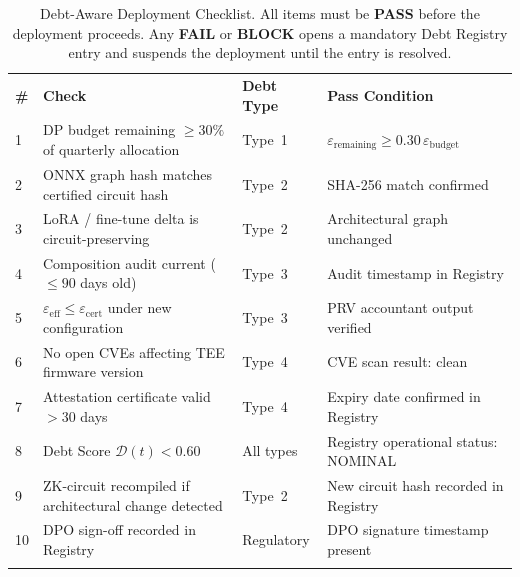 \begin{table}[ht]
\centering
\caption{Debt-Aware Deployment Checklist.
  All items must be \textbf{PASS} before the deployment
  proceeds.
  Any \textbf{FAIL} or \textbf{BLOCK} opens a mandatory
  Debt Registry entry and suspends the deployment until
  the entry is resolved.}
\label{tab:deployment-checklist}
\small
\begin{tabular}{p{0.4cm}p{4.4cm}p{2.0cm}p{4.0cm}}
\hline\noalign{\smallskip}
\textbf{\#}
  & \textbf{Check}
  & \textbf{Debt Type}
  & \textbf{Pass Condition} \\
\noalign{\smallskip}\svhline\noalign{\smallskip}

1 & DP budget remaining $\geq 30\%$ of quarterly allocation
  & Type~1
  & $\varepsilon_{\mathrm{remaining}} \geq 0.30\,
    \varepsilon_{\mathrm{budget}}$ \\[3pt]

2 & ONNX graph hash matches certified circuit hash
  & Type~2
  & SHA-256 match confirmed \\[3pt]

3 & LoRA / fine-tune delta is circuit-preserving
  & Type~2
  & Architectural graph unchanged \\[3pt]

4 & Composition audit current ($\leq 90$ days old)
  & Type~3
  & Audit timestamp in Registry \\[3pt]

5 & $\varepsilon_{\mathrm{eff}} \leq \varepsilon_{\mathrm{cert}}$
    under new configuration
  & Type~3
  & PRV accountant output verified \\[3pt]

6 & No open CVEs affecting TEE firmware version
  & Type~4
  & CVE scan result: clean \\[3pt]

7 & Attestation certificate valid $> 30$ days
  & Type~4
  & Expiry date confirmed in Registry \\[3pt]

8 & Debt Score $\mathcal{D}(t) < 0.60$
  & All types
  & Registry operational status: NOMINAL \\[3pt]

9 & ZK-circuit recompiled if architectural change detected
  & Type~2
  & New circuit hash recorded in Registry \\[3pt]

10 & DPO sign-off recorded in Registry
   & Regulatory
   & DPO signature timestamp present \\

\noalign{\smallskip}\hline\noalign{\smallskip}
\end{tabular}
\end{table}

